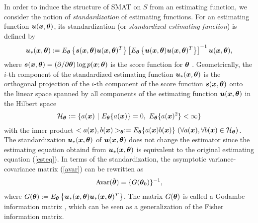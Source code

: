 \documentclass[graybox]{svmult}
\newcommand{\bm}[1]{\mbox{\boldmath $#1$}}
\newcommand{\bms}[1]{\mbox{\scriptsize\boldmath $#1$}}
\begin{document}
In order to induce the structure of SMAT on $S$ from an estimating function, we consider
the notion of {\em standardization} of estimating functions. For an estimating function
$\bm{u}(\bm{x},\bm{\theta})$, its standardization
(or {\em standardized estimating function}) is defined by
%
\begin{eqnarray*}
   \bm{u}_{\ast}(\bm{x},\bm{\theta})
   := E_{\bms{\theta}}\left\{\bm{s}(\bm{x},\bm{\theta})\bm{u}(\bm{x},\bm{\theta})^T\right\}
      \left[E_{\bms{\theta}}\left\{\bm{u}(\bm{x},\bm{\theta})\bm{u}
      (\bm{x},\bm{\theta})^T\right\}\right]^{-1}\bm{u}(\bm{x},\bm{\theta}),
\end{eqnarray*}
%
where $\bm{s}(\bm{x},\bm{\theta})=(\partial/\partial\bm{\theta})\log p(\bm{x};\bm{\theta})$
is the score function for $\bm{\theta}$ \cite{H}.
Geometrically, the $i$-th component of the standardized estimating function
$\bm{u}_{\ast}(\bm{x},\bm{\theta})$ is the orthogonal projection of the $i$-th component of
the score function $\bm{s}(\bm{x},\bm{\theta})$ onto the linear space spanned by
all components of the estimating function $\bm{u}(\bm{x},\bm{\theta})$ in the Hilbert space
%
\begin{eqnarray*}
   {\cal H}_{\bms{\theta}} := \{a(\bm{x}) \ | \ E_{\bms{\theta}}\{a(\bm{x})\} = 0, \
                                E_{\bms{\theta}}\{a(\bm{x})^2\} < \infty\}
\end{eqnarray*}
%
with the inner product
$<a(\bm{x}), b(\bm{x})>_{\bms{\theta}}:=E_{\bms{\theta}}\{a(\bm{x})b(\bm{x})\} \
(\forall a(\bm{x}), \forall b(\bm{x}) \in {\cal H}_{\bms{\theta}})$.
The standardization $\bm{u}_{\ast}(\bm{x},\bm{\theta})$ of $\bm{u}(\bm{x},\bm{\theta})$ does
not change the estimator since the estimating equation obtaind from
$\bm{u}_{\ast}(\bm{x},\bm{\theta})$ is equivalent to the original estimating equation
(\ref{esteq}).
In terms of the standardization, the asymptotic variance-covariance matrix (\ref{avar}) can
be rewritten as
%
\begin{eqnarray*}
   {\rm Avar}(\hat{\bm{\theta}}) = \{G(\bm{\theta}_0)\}^{-1},
\end{eqnarray*}
%
where $G(\bm{\theta}):=E_{\bms{\theta}}\left\{\bm{u}_{\ast}(\bm{x},\bm{\theta})\bm{u}_{\ast}
(\bm{x},\bm{\theta})^T\right\}$.
The matrix $G(\bm{\theta})$ is called a Godambe information matrix \cite{G}, which can be seen
as a generalization of the Fisher information matrix.
\end{document}
